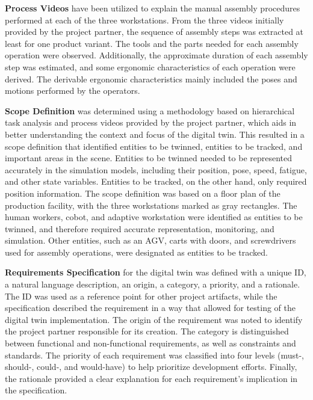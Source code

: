 \documentclass{llncs}
\begin{document}
    \textbf{Process Videos} have been utilized to explain the manual assembly procedures performed at each of the three workstations. From the three videos initially provided by the project partner,  
    the sequence of assembly steps was extracted at least for one product variant. The tools and the parts needed for each assembly operation were observed. Additionally, the approximate duration of each assembly step 
    was estimated, and some ergonomic characteristics of each operation were derived. 
    The derivable ergonomic characteristics mainly included the poses and motions performed by the operators.

    \textbf{Scope Definition} was determined using a methodology based on hierarchical task analysis and process videos provided by the project partner, which aids in better understanding the context and focus of the digital twin.
    This resulted in a scope definition that identified entities to be twinned, entities to be tracked, and important areas in the scene. 
    Entities to be twinned needed to be represented accurately in the simulation models, including their position, pose, speed, fatigue, and other state variables. 
    Entities to be tracked, on the other hand, only required position information. The scope definition was based on a floor plan of the production facility, with the three workstations marked as gray rectangles. 
    The human workers, cobot, and adaptive workstation were identified as entities to be twinned, and therefore required accurate representation, 
    monitoring, and simulation. Other entities, such as an AGV, carts with doors, and screwdrivers used for assembly operations, were designated as entities to be tracked.

    \textbf{Requirements Specification} for the digital twin was defined with a unique ID, a natural language description, an origin, a category, a priority, and a rationale. The ID was used as a reference point for other project artifacts, while the specification described the requirement in a way that allowed for testing of the digital twin implementation. The origin of the requirement was noted to identify the project partner responsible for its creation.
     The category is distinguished between functional and non-functional requirements, as well as constraints and standards. The priority of each requirement was classified into four levels 
    (must-, should-, could-, and would-have) to help prioritize development efforts. 
    Finally, the rationale provided a clear explanation for each requirement's implication in the specification.
\end{document}
